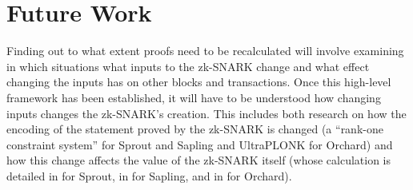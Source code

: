 \documentclass{article}
\begin{document}
\section{Future Work}

Finding out to what extent proofs need to be recalculated will involve examining in which situations what inputs to the zk-SNARK change and what effect changing the inputs has on other blocks and transactions.
Once this high-level framework has been established, it will have to be understood how changing inputs changes the zk-SNARK's creation.
This includes both research on how the encoding of the statement proved by the zk-SNARK is changed (a ``rank-one constraint system'' \cite{bensasson:snarksc} for Sprout and Sapling and UltraPLONK \cite{zcash:halo2} for Orchard) and how this change affects the value of the zk-SNARK itself (whose calculation is detailed in \cite{bensasson:zksnark} for Sprout, in \cite{groth:zksnark} for Sapling, and in \cite{zcash:halo2} for Orchard).
\end{document}
